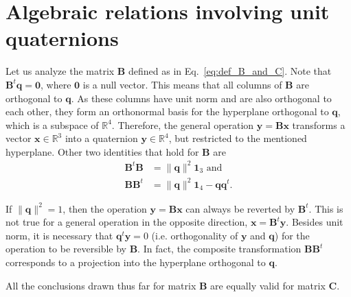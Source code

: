 \documentclass[aip,jcp,reprint,amsmath,amssymb,raggedbottom]{revtex4-1}
\newcommand{\mt}[1]{\boldsymbol{\mathbf{#1}}}           %
\newcommand{\vt}[1]{\boldsymbol{\mathbf{#1}}}           %
\newcommand{\tr}[1]{#1^t}                               %
\begin{document}
\section{\label{sec:auxiliary_math}Algebraic relations involving unit quaternions}

Let us analyze the matrix $\mt B$ defined as in Eq.~\ref{eq:def_B_and_C}. Note that $\tr{\mt B}\vt q = \vt 0$, where $\vt 0$ is a null vector.\cite{Haug1989, Shuster1993, Dichmann1999} This means that all columns of $\mt B$ are orthogonal to $\vt q$. As these columns have unit norm and are also orthogonal to each other, they form an orthonormal basis for the hyperplane orthogonal to $\mt q$, which is a subspace of $\mathbb{R}^4$. Therefore, the general operation $\vt y = \mt B \vt x$ transforms a vector $\vt x \in \mathbb{R}^3$ into a quaternion $\vt y \in \mathbb{R}^4$, but restricted to the mentioned hyperplane. Other two identities that hold for $\mt B$ are\citep{Haug1989}
\begin{align*}
\tr{\mt B}\mt B &= \lVert \vt q \lVert ^2{\mt 1}_3 \text{ and} \\
\mt B\tr{\mt B} &= \lVert \vt q \lVert ^2{\mt 1}_4 - {\vt q}\tr{\vt q}.
\end{align*}

If $\lVert \vt q \lVert^2 = 1$, then the operation $\vt y = \mt B \vt x$ can always be reverted by $\tr{\mt B}$. This is not true for a general operation in the opposite direction, $\vt x = \tr{\mt B} \vt y$. Besides unit norm, it is necessary that $\tr{\vt q}\vt y = 0$ (i.e. orthogonality of $\vt y$ and $\vt q$) for the operation to be reversible by $\mt B$. In fact, the composite transformation $\mt B\tr{\mt B}$ corresponds to a projection into the hyperplane orthogonal to $\vt q$.\cite{Dichmann1999}

All the conclusions drawn thus far for matrix $\mt B$ are equally valid for matrix $\mt C$.
\end{document}
